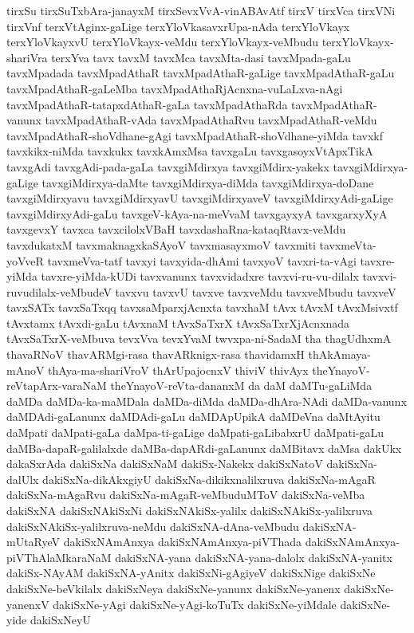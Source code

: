 {tirxSu
tirxSuTxbAra-janayxM
tirxSevxVvA-vinABAvAtf
tirxV
tirxVca
tirxVNi
tirxVnf
terxVtAginx-gaLige
terxYloVkasavxrUpa-nAda
terxYloVkayx
terxYloVkayxvU
terxYloVkayx-veMdu
terxYloVkayx-veMbudu
terxYloVkayx-shariVra
terxYva
tavx
tavxM
tavxMca
tavxMta-dasi
tavxMpada-gaLu
tavxMpadada
tavxMpadAthaR
tavxMpadAthaR-gaLige
tavxMpadAthaR-gaLu
tavxMpadAthaR-gaLeMba
tavxMpadAthaRjAcnxna-vuLaLxva-nAgi
tavxMpadAthaR-tatapxdAthaR-gaLa
tavxMpadAthaRda
tavxMpadAthaR-vanunx
tavxMpadAthaR-vAda
tavxMpadAthaRvu
tavxMpadAthaR-veMdu
tavxMpadAthaR-shoVdhane-gAgi
tavxMpadAthaR-shoVdhane-yiMda
tavxkf
tavxkikx-niMda
tavxkukx
tavxkAmxMsa
tavxgaLu
tavxgasoyxVtApxTikA
tavxgAdi
tavxgAdi-pada-gaLa
tavxgiMdirxya
tavxgiMdirx-yakekx
tavxgiMdirxya-gaLige
tavxgiMdirxya-daMte
tavxgiMdirxya-diMda
tavxgiMdirxya-doDane
tavxgiMdirxyavu
tavxgiMdirxyavU
tavxgiMdirxyaveV
tavxgiMdirxyAdi-gaLige
tavxgiMdirxyAdi-gaLu
tavxgeV-kAya-na-meVvaM
tavxgayxyA
tavxgarxyXyA
tavxgevxY
tavxca
tavxcilolxVBaH
tavxdashaRna-kataqRtavx-veMdu
tavxdukatxM
tavxmaknagxkaSAyoV
tavxmasayxmoV
tavxmiti
tavxmeVta-yoVveR
tavxmeVva-tatf
tavxyi
tavxyida-dhAmi
tavxyoV
tavxri-ta-vAgi
tavxre-yiMda
tavxre-yiMda-kUDi
tavxvanunx
tavxvidadxre
tavxvi-ru-vu-dilalx
tavxvi-ruvudilalx-veMbudeV
tavxvu
tavxvU
tavxve
tavxveMdu
tavxveMbudu
tavxveV
tavxSATx
tavxSaTxqq
tavxsaMparxjAcnxta
tavxhaM
tAvx
tAvxM
tAvxMsivxtf
tAvxtamx
tAvxdi-gaLu
tAvxnaM
tAvxSaTxrX
tAvxSaTxrXjAcnxnada
tAvxSaTxrX-veMbuva
tevxVva
tevxYvaM
twvxpa-ni-SadaM
tha
thagUdhxmA
thavaRNoV
thavARMgi-rasa
thavARknigx-rasa
thavidamxH
thAkAmaya-mAnoV
thAya-ma-shariVroV
thArUpajocnxV
thiviV
thivAyx
theYnayoV-reVtapArx-varaNaM
theYnayoV-reVta-dananxM
da
daM
daMTu-gaLiMda
daMDa
daMDa-ka-maMDala
daMDa-diMda
daMDa-dhAra-NAdi
daMDa-vanunx
daMDAdi-gaLanunx
daMDAdi-gaLu
daMDApUpikA
daMDeVna
daMtAyitu
daMpati
daMpati-gaLa
daMpa-ti-gaLige
daMpati-gaLibabxrU
daMpati-gaLu
daMBa-dapaR-galilalxde
daMBa-dapARdi-gaLanunx
daMBitavx
daMsa
dakUkx
dakaSxrAda
dakiSxNa
dakiSxNaM
dakiSx-Nakekx
dakiSxNatoV
dakiSxNa-dalUlx
dakiSxNa-dikAkxgiyU
dakiSxNa-dikikxnalilxruva
dakiSxNa-mAgaR
dakiSxNa-mAgaRvu
dakiSxNa-mAgaR-veMbuduMToV
dakiSxNa-veMba
dakiSxNA
dakiSxNAkiSxNi
dakiSxNAkiSx-yalilx
dakiSxNAkiSx-yalilxruva
dakiSxNAkiSx-yalilxruva-neMdu
dakiSxNA-dAna-veMbudu
dakiSxNA-mUtaRyeV
dakiSxNAmAnxya
dakiSxNAmAnxya-piVThada
dakiSxNAmAnxya-piVThAlaMkaraNaM
dakiSxNA-yana
dakiSxNA-yana-dalolx
dakiSxNA-yanitx
dakiSx-NAyAM
dakiSxNA-yAnitx
dakiSxNi-gAgiyeV
dakiSxNige
dakiSxNe
dakiSxNe-beVkilalx
dakiSxNeya
dakiSxNe-yanunx
dakiSxNe-yanenx
dakiSxNe-yanenxV
dakiSxNe-yAgi
dakiSxNe-yAgi-koTuTx
dakiSxNe-yiMdale
dakiSxNe-yide
dakiSxNeyU
}
